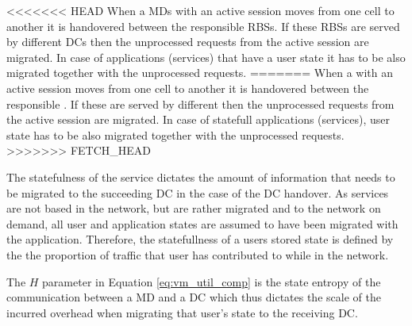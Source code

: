 


<<<<<<< HEAD
When a \ac{MD}s with an active session moves from one cell to another it is handovered between the responsible \ac{RBS}s.
If these \ac{RBS}s are served by different \ac{DC}s then the unprocessed requests from the active session are migrated.
In case of applications (services) that have a user state it has to be also migrated together with the unprocessed requests.
=======
When a \ue{} with an active session moves from one cell to another it is handovered between the responsible \rbss{}.
If these \rbss{} are served by different \dcs{} then the unprocessed requests from the active session are migrated.
In case of statefull applications (services), user state has to be also migrated together with the unprocessed requests.
>>>>>>> FETCH_HEAD

The statefulness of the service dictates the amount of information that needs to be migrated to the succeeding \ac{DC} in the case of the \ac{DC} handover. As services are not based in the network, but are rather migrated and to the \xcloud{} network on demand, all user and application states are assumed to have been migrated with the application. Therefore, the statefullness of a users stored state is defined by the the proportion of traffic that user has contributed to while in the network.

The $H$ parameter in Equation \ref{eq:vm_util_comp} is the state entropy of the communication between a \ac{MD} and a \ac{DC} which thus dictates the scale of the incurred overhead when migrating that user's state  to the receiving \ac{DC}.
